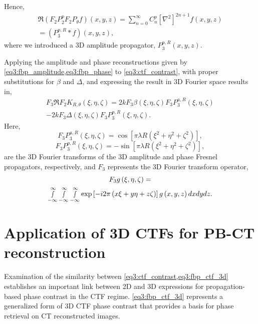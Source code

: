 \documentclass[twocolumn, switch]{article} %
\begin{document}
Hence,
\begin{multline}
    \label{eq3:fbp_phase}
    \Re \left( {{F_2}P_2^p{F_2}{P_\theta }f} \right)\left( {x,y,z} \right)
    = \sum\limits_{n = 0}^\infty  {C_n^p{{\left[ {{\nabla ^2}} \right]}^{2n + 1}}} f(x,y,z) \\
    = (P_3^{p,R} * f)\left( {x,y,z} \right),
\end{multline}
where we introduced a 3D amplitude propagator, $P_3^{p,R}(x,y,z)$.

Applying the amplitude and phase reconstructions given by \cref{eq3:fbp_amplitude,eq3:fbp_phase} to \cref{eq3:ctf_contrast}, with proper substitutions for $\beta$ and $\Delta$, and expressing the result in 3D Fourier space results in,
\begin{multline}
    \label{eq3:fbp_ctf_3d}
    {F_3}\Re {F_2}{K_{R,\theta }}\left( {\xi ,\eta ,\zeta } \right) = 2k{F_3}\beta \left( {\xi ,\eta ,\zeta } \right){F_3}P_3^{a,R}\left( {\xi ,\eta ,\zeta } \right) \\
    - 2k{F_3}\Delta \left( {\xi ,\eta ,\zeta } \right){F_3}P_3^{p,R}\left( {\xi ,\eta ,\zeta } \right).
\end{multline}
Here, 
\begin{equation}
    \label{eq3:amplitude_propagator}
    {F_3}P_3^{a,R}\left( {\xi ,\eta ,\zeta } \right) = \cos \left[ {\pi \lambda R\left( {{\xi ^2} + {\eta ^2} + {\zeta ^2}} \right)} \right],    
\end{equation}
\begin{equation}
    \label{eq3:phase_propagator}
    {F_3}P_3^{p,R}\left( {\xi ,\eta ,\zeta } \right) =  - \sin \left[ {\pi \lambda R\left( {{\xi ^2} + {\eta ^2} + {\zeta ^2}} \right)} \right],
\end{equation}
are the 3D Fourier transforms of the 3D amplitude and phase Fresnel propagators, respectively, and ${F_3}$ represents the 3D Fourier transform operator,
\begin{multline}
    \label{eq3:fourier_operator_3d}
    {F_3}g\left( {\xi ,\eta ,\zeta } \right) = \\\mathop \smallint \limits_{ - \infty }^\infty  \mathop \smallint \limits_{ - \infty }^\infty  \mathop \smallint \limits_{ - \infty }^\infty  \exp \left[ { - i2\pi \left( {x\xi  + y\eta  + z\zeta } \right)} \right]g\left( {x,y,z} \right)dxdydz.
\end{multline}

\section{Application of 3D CTFs for PB-CT reconstruction} \label{s3:derivation_2}
Examination of the similarity between \cref{eq3:ctf_contrast,eq3:fbp_ctf_3d} establishes an important link between 2D and 3D expressions for propagation-based phase contrast in the CTF regime. \cref{eq3:fbp_ctf_3d} represents a generalized form of 3D CTF phase contrast that provides a basis for phase retrieval on CT reconstructed images.
\end{document}
